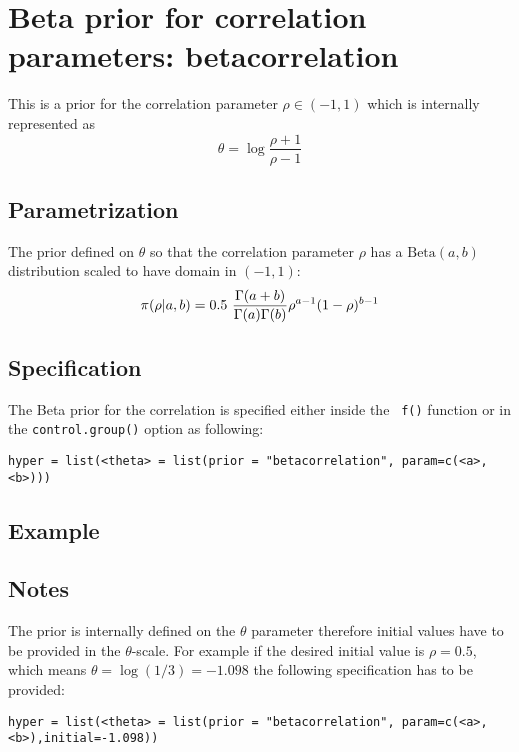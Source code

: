 \documentclass[a4paper,11pt]{article}
\begin{document}
\section*{Beta prior for correlation parameters: betacorrelation}

This is a prior for the correlation parameter $\rho\in(-1,1)$ which is
internally represented as
\[
\theta = \log\frac{\rho+1}{\rho-1}
\]

\subsection*{Parametrization}

The prior defined on $\theta$ so that the correlation parameter $\rho$
has a $\text{Beta}(a,b)$ distribution scaled to have domain in
$(-1,1)$:
\[
\pi(\rho|a,b) = 0.5\ {\Gamma(a+b) \over \Gamma(a) \Gamma(b)}
\rho^{a-1} (1-\rho)^{b-1} 
\]  


\subsection*{Specification}
The Beta prior for the correlation is specified either inside the {\tt
    f()} function or in the {\tt control.group()} option as following:
\begin{center}
    {\tt hyper = list(<theta> = list(prior = "betacorrelation", param=c(<a>,<b>)))}
\end{center}
\subsection*{Example}

\subsection*{Notes}

The prior is internally defined on the $\theta$ parameter therefore
initial values have to be provided in the $\theta$-scale. For example
if the desired initial value is $\rho=0.5$, which means
$\theta=\log(1/3)=-1.098$ the following specification has to be
provided:
\begin{center}
    {\tt hyper = list(<theta> = list(prior = "betacorrelation", param=c(<a>,<b>),initial=-1.098))}
\end{center}
\end{document}
